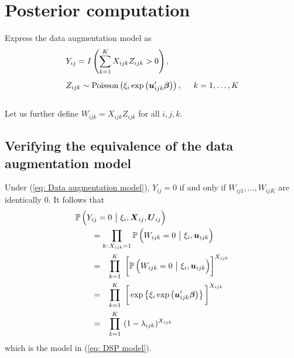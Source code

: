 \documentclass[11pt]{article}
\newcommand{\prob}{\mathbb{P}\,}
\renewcommand{\vec}{\boldsymbol}
\newcommand{\barM}{~\big|~}
\newcommand{\ind}{I}
\begin{document}

\section{Posterior computation}

Express the data augmentation model as
\begin{align} \label{eq: Data augmentation model}
& Y_{ij} = \ind \left( \sum_{k=1}^K X_{ijk} Z_{ijk} > 0 \right), \nonumber \\[1ex]
& Z_{ijk} \sim \text{Poisson}\left( \xi_i \exp\left( \vec{u}_{ijk}^\prime \vec{\beta} \right)\right), \hspace{5mm}  k=1,\dots,K
\end{align} \\
Let us further define $W_{ijk} = X_{ijk} Z_{ijk}$ for all $i,j,k$.





\subsection{Verifying the equivalence of the data augmentation model}

Under (\ref{eq: Data augmentation model}), $Y_{ij} = 0$ if and only if $W_{ij1}, \dots, W_{ijK}$ are identically 0.  It follows that
\begin{align*} \MoveEqLeft
\prob \Big( Y_{ij} = 0 \barM \xi_i, \vec{X}_{ij}, \vec{U}_{ij} \Big) \\
&= \prod_{k{:}\, X_{ijk} = 1} \prob\Big( W_{ijk} = 0 \barM \xi_i, \vec{u}_{ijk} \Big) \\
&= \hspace{2.75mm} \prod_{k = 1}^K~ \bigg[ \prob\Big( W_{ijk} = 0 \barM \xi_i, \vec{u}_{ijk} \Big) \bigg]^{X_{ijk}} \\
&= \hspace{2.75mm} \prod_{k = 1}^K~ \bigg[ \exp\left\{ \xi_i \exp\left( \vec{u}_{ijk}^\prime \vec{\beta} \right)\right\} \bigg]^{X_{ijk}} \\
&= \hspace{2.75mm} \prod_{k = 1}^K~ (1 - \lambda_{ijk})^{X_{ijk}}
\end{align*}
which is the model in (\ref{eq: DSP model}).
\end{document}
